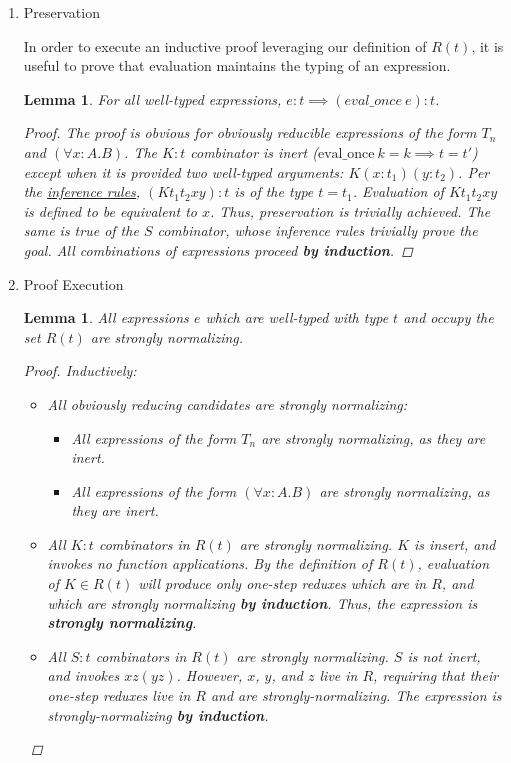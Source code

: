 \documentclass[11pt]{article}
\newtheorem{lemma}[theorem]{Lemma}
\begin{document}
\begin{enumerate}
\item Preservation
\label{sec:org23dfefc}

In order to execute an inductive proof leveraging our definition of \(R(t)\), it is useful to prove that evaluation maintains the typing of an expression.

\begin{lemma}
For all well-typed expressions, $e : t \implies (eval\_once\ e) : t$.
\begin{proof}
The proof is obvious for obviously reducible expressions of the form $T_{n}$ and $(\forall x:A.B)$.
The $K : t$ combinator is inert ($\text{eval\_once}\ k = k \implies t = t'$) except when it is provided two well-typed arguments: $K (x : t_{1}) (y : t_{2})$.
Per the \href{inference:1}{inference rules}, $(K t_{1} t_{2} x y) : t$ is of the type $t = t_{1}$.
Evaluation of $K t_{1} t_{2} x y$ is defined to be equivalent to $x$. Thus, preservation is trivially achieved.
The same is true of the $S$ combinator, whose inference rules trivially prove the goal. All combinations of expressions proceed \textbf{by induction}.
\end{proof}
\end{lemma}
\item Proof Execution
\label{sec:orgc961a88}

\begin{lemma}
All expressions $e$ which are well-typed with type $t$ and occupy the set $R(t)$ are strongly normalizing.
\begin{proof}
Inductively: \\
\begin{itemize}
\item All obviously reducing candidates are strongly normalizing:
\begin{itemize}
\item All expressions of the form $T_{n}$ are strongly normalizing, as they are inert.
\item All expressions of the form $(\forall x : A.B)$ are strongly normalizing, as they are inert.
\end{itemize}
\item All $K : t$ combinators in $R(t)$ are strongly normalizing. $K$ is insert, and invokes no function applications. By the definition of $R(t)$, evaluation of $K \in R(t)$ will produce only one-step reduxes which are in $R$, and which are strongly normalizing \textbf{by induction}. Thus, the expression is \textbf{strongly normalizing}.
\item All $S : t$ combinators in $R(t)$ are strongly normalizing. $S$ is not inert, and invokes $xz (yz)$. However, $x$, $y$, and $z$ live in $R$, requiring that their one-step reduxes live in $R$ and are strongly-normalizing. The expression is strongly-normalizing \textbf{by induction}.
\end{itemize}
\end{proof}
\end{lemma}


\end{enumerate}
\end{document}
